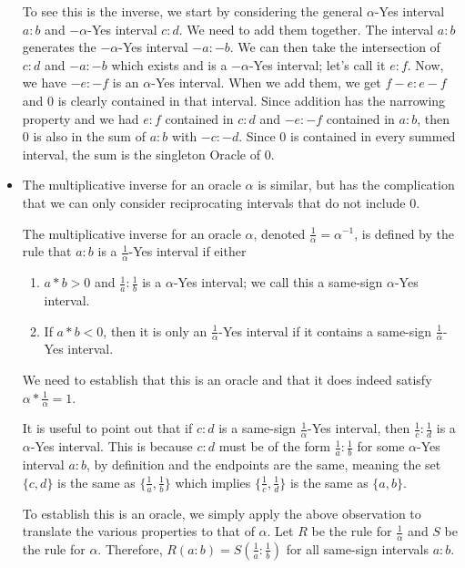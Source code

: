 \documentclass[12pt]{article}
\theoremstyle{remark}
\begin{document}
\begin{itemize}
    To see this is the inverse, we start by considering the general $\alpha$-Yes interval $a:b$ and $-\alpha$-Yes interval $c:d$. We need to add them together. The interval $a:b$ generates the $-\alpha$-Yes interval $-a:-b$. We can then take the intersection of $c:d$ and $-a:-b$ which exists and is a $-\alpha$-Yes interval; let's call it $e:f$. Now, we have $-e:-f$ is an $\alpha$-Yes interval. When we add them, we get $f-e:e-f$ and $0$ is clearly contained in that interval. Since addition has the narrowing property and we had $e:f$ contained in $c:d$ and $-e:-f$ contained in $a:b$, then $0$ is also in the sum of $a:b$ with $-c:-d$. Since $0$ is contained in every summed interval, the sum is the singleton Oracle of $0$. 
    
    \item The multiplicative inverse for an oracle $\alpha$ is similar, but has the complication that we can only consider reciprocating intervals that do not include 0. 
    
    The multiplicative inverse for an oracle $\alpha$, denoted $\frac{1}{\alpha} = \alpha^{-1}$, is defined by the rule that $a:b$ is a $\frac{1}{\alpha}$-Yes interval if either 
    
    \begin{enumerate}
        \item  $a*b > 0$  and $\frac{1}{a}:\frac{1}{b}$ is a $\alpha$-Yes interval; we call this a same-sign $\alpha$-Yes interval.
        \item If $a*b<0$, then it is only an $\frac{1}{\alpha}$-Yes interval if it contains a same-sign $\frac{1}{\alpha}$-Yes interval. 
    \end{enumerate}
    
    We need to establish that this is an oracle and that it does indeed satisfy $\alpha * \frac{1}{\alpha} = 1$.
    
    It is useful to point out that if $c:d$ is a same-sign $\frac{1}{\alpha}$-Yes interval, then $\frac{1}{c}:\frac{1}{d}$ is a $\alpha$-Yes interval. This is because $c:d$ must be of the form $\frac{1}{a}:\frac{1}{b}$ for some $\alpha$-Yes interval $a:b$, by definition and the endpoints are the same, meaning the set $\{c,d\}$ is the same as $\{\frac{1}{a}, \frac{1}{b}\}$ which implies $\{\frac{1}{c}, \frac{1}{d}\}$ is the same as $\{a, b\}$.
    
    To establish this is an oracle, we simply apply the above observation to translate the various properties to that of $\alpha$. Let $R$ be the rule for $\frac{1}{\alpha}$ and $S$ be the rule for $\alpha$. Therefore, $R(a:b)=S(\frac{1}{a}:\frac{1}{b})$ for all same-sign intervals $a:b$.
    

\end{itemize}
\end{document}
